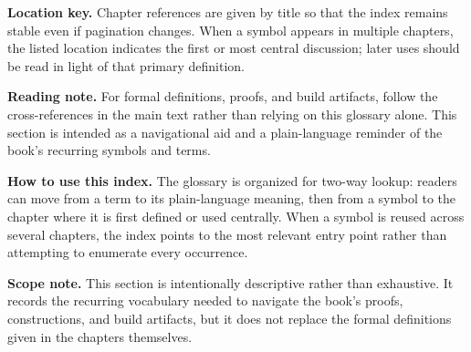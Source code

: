 \medskip

\noindent\textbf{Location key.} Chapter references are given by title so that the index remains stable even if pagination changes. When a symbol appears in multiple chapters, the listed location indicates the first or most central discussion; later uses should be read in light of that primary definition.

\medskip

\noindent\textbf{Reading note.} For formal definitions, proofs, and build artifacts, follow the cross-references in the main text rather than relying on this glossary alone. This section is intended as a navigational aid and a plain-language reminder of the book's recurring symbols and terms.

\medskip

\noindent\textbf{How to use this index.} The glossary is organized for two-way lookup: readers can move from a term to its plain-language meaning, then from a symbol to the chapter where it is first defined or used centrally. When a symbol is reused across several chapters, the index points to the most relevant entry point rather than attempting to enumerate every occurrence.

\medskip

\noindent\textbf{Scope note.} This section is intentionally descriptive rather than exhaustive. It records the recurring vocabulary needed to navigate the book's proofs, constructions, and build artifacts, but it does not replace the formal definitions given in the chapters themselves.
